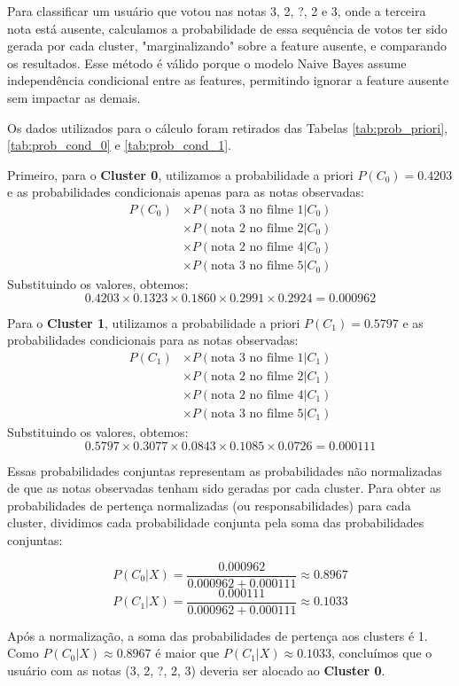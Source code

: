 \begin{enumerate}[label=(\alph*)]
    Para classificar um usuário que votou nas notas 3, 2, ?, 2 e 3, onde a terceira nota está ausente, calculamos a probabilidade de essa sequência de votos ter sido gerada por cada cluster, "marginalizando" sobre a feature ausente, e comparando os resultados.  Esse método é válido porque o modelo Naive Bayes assume independência condicional entre as features, permitindo ignorar a feature ausente sem impactar as demais. 
    
    
    Os dados utilizados para o cálculo foram retirados das Tabelas \ref{tab:prob_priori}, \ref{tab:prob_cond_0} e \ref{tab:prob_cond_1}.

Primeiro, para o \textbf{Cluster 0}, utilizamos a probabilidade a priori \( P(C_0) = 0.4203 \) e as probabilidades condicionais apenas para as notas observadas:
\begin{align*}
    P(C_0) &\times P(\text{nota 3 no filme 1}|C_0) \\
    &\times P(\text{nota 2 no filme 2}|C_0) \\
    &\times P(\text{nota 2 no filme 4}|C_0) \\
    &\times P(\text{nota 3 no filme 5}|C_0)
\end{align*}    
Substituindo os valores, obtemos:
\[
0.4203 \times 0.1323 \times 0.1860 \times 0.2991 \times 0.2924 = 0.000962
\]

Para o \textbf{Cluster 1}, utilizamos a probabilidade a priori \( P(C_1) = 0.5797 \) e as probabilidades condicionais para as notas observadas:
\begin{align*}
    P(C_1) &\times P(\text{nota 3 no filme 1}|C_1) \\
    &\times P(\text{nota 2 no filme 2}|C_1) \\
    &\times P(\text{nota 2 no filme 4}|C_1) \\
    &\times P(\text{nota 3 no filme 5}|C_1)
\end{align*}
Substituindo os valores, obtemos:
\[
0.5797 \times 0.3077 \times 0.0843 \times 0.1085 \times 0.0726 = 0.000111
\]

Essas probabilidades conjuntas representam as probabilidades não normalizadas de que as notas observadas tenham sido geradas por cada cluster. Para obter as probabilidades de pertença normalizadas (ou responsabilidades) para cada cluster, dividimos cada probabilidade conjunta pela soma das probabilidades conjuntas:

\[
P(C_0 | X) = \frac{0.000962}{0.000962 + 0.000111} \approx 0.8967
\]
\[
P(C_1 | X) = \frac{0.000111}{0.000962 + 0.000111} \approx 0.1033
\]

Após a normalização, a soma das probabilidades de pertença aos clusters é 1. Como \( P(C_0 | X) \approx 0.8967 \) é maior que \( P(C_1 | X) \approx 0.1033 \), concluímos que o usuário com as notas (3, 2, ?, 2, 3) deveria ser alocado ao \textbf{Cluster 0}.

\end{enumerate}

